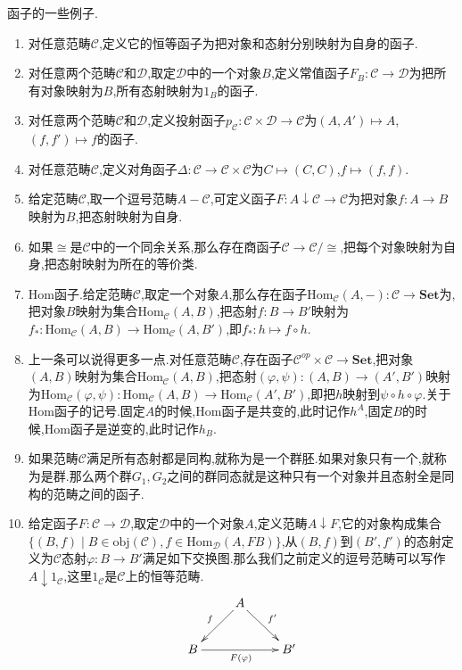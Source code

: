 函子的一些例子.
\begin{enumerate}
	\item 对任意范畴$\mathscr{C}$,定义它的恒等函子为把对象和态射分别映射为自身的函子.
	\item 对任意两个范畴$\mathscr{C}$和$\mathscr{D}$,取定$\mathscr{D}$中的一个对象$B$,定义常值函子$F_B:\mathscr{C}\to\mathscr{D}$为把所有对象映射为$B$,所有态射映射为$1_B$的函子.
	\item 对任意两个范畴$\mathscr{C}$和$\mathscr{D}$,定义投射函子$p_{\mathscr{C}}:\mathscr{C}\times\mathscr{D}\to\mathscr{C}$为$(A,A')\mapsto A$,$(f,f')\mapsto f$的函子.
	\item 对任意范畴$\mathscr{C}$,定义对角函子$\Delta:\mathscr{C}\to\mathscr{C}\times\mathscr{C}$为$C\mapsto(C,C)$,$f\mapsto(f,f)$.
	\item 给定范畴$\mathscr{C}$,取一个逗号范畴$A-\mathscr{C}$,可定义函子$F:A\downarrow\mathscr{C}\to\mathscr{C}$为把对象$f:A\to B$映射为$B$,把态射映射为自身.
	\item 如果$\cong$是$\mathscr{C}$中的一个同余关系,那么存在商函子$\mathscr{C}\to\mathscr{C}/\cong$,把每个对象映射为自身,把态射映射为所在的等价类.
	\item Hom函子.给定范畴$\mathscr{C}$,取定一个对象$A$,那么存在函子$\mathrm{Hom}_{\mathscr{C}}(A,-):\mathscr{C}\to\textbf{Set}$为,把对象$B$映射为集合$\mathrm{Hom}_{\mathscr{C}}(A,B)$,把态射$f:B\to B'$映射为$f_*:\mathrm{Hom}_{\mathscr{C}}(A,B)\to\mathrm{Hom}_{\mathscr{C}}(A,B')$,即$f_*:h\mapsto f\circ h$.
	\item 上一条可以说得更多一点.对任意范畴$\mathscr{C}$,存在函子$\mathscr{C}^{op}\times\mathscr{C}\to\textbf{Set}$,把对象$(A,B)$映射为集合$\mathrm{Hom}_{\mathscr{C}}(A,B)$,把态射$(\varphi,\psi):(A,B)\to(A',B')$映射为$\mathrm{Hom}_{\mathscr{C}}(\varphi,\psi):\mathrm{Hom}_{\mathscr{C}}(A,B)\to\mathrm{Hom}_{\mathscr{C}}(A',B')$,即把$h$映射到$\psi\circ h\circ\varphi$.关于Hom函子的记号.固定$A$的时候,Hom函子是共变的,此时记作$h^A$,固定$B$的时候,Hom函子是逆变的,此时记作$h_B$.
	\item 如果范畴$\mathscr{C}$满足所有态射都是同构,就称为是一个群胚.如果对象只有一个,就称为是群.那么两个群$G_1,G_2$之间的群同态就是这种只有一个对象并且态射全是同构的范畴之间的函子.
	\item 给定函子$F:\mathscr{C}\to\mathscr{D}$,取定$\mathscr{D}$中的一个对象$A$,定义范畴$A\downarrow F$,它的对象构成集合$\{(B,f)\mid B\in\mathrm{obj}(\mathscr{C}),f\in\mathrm{Hom}_{\mathscr{D}}(A,FB)\}$,从$(B,f)$到$(B',f')$的态射定义为$\mathscr{C}$态射$\varphi:B\to B'$满足如下交换图.那么我们之前定义的逗号范畴可以写作$A\downarrow 1_{\mathscr{C}}$,这里$1_{\mathscr{C}}$是$\mathscr{C}$上的恒等范畴.
	$$\xymatrix{&A\ar[dl]_f\ar[dr]^{f'}&\\B\ar[rr]_{F(\varphi)}&&B'}$$
\end{enumerate}

